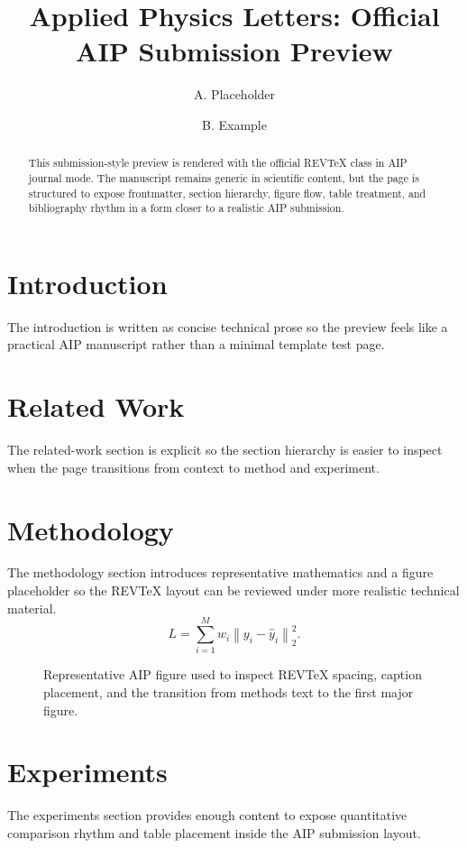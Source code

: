 \documentclass[aip,apl,reprint]{revtex4-2}
\begin{document}
\title{Applied Physics Letters: Official AIP Submission Preview}
\author{A. Placeholder}
\author{B. Example}
\begin{abstract}
This submission-style preview is rendered with the official REVTeX class in AIP journal mode. The manuscript remains generic in scientific content, but the page is structured to expose frontmatter, section hierarchy, figure flow, table treatment, and bibliography rhythm in a form closer to a realistic AIP submission.
\end{abstract}
\maketitle
\section{Introduction}
The introduction is written as concise technical prose so the preview feels like a practical AIP manuscript rather than a minimal template test page.
\section{Related Work}
The related-work section is explicit so the section hierarchy is easier to inspect when the page transitions from context to method and experiment.
\section{Methodology}
The methodology section introduces representative mathematics and a figure placeholder so the REVTeX layout can be reviewed under more realistic technical material.
\begin{equation}
L = \sum_{i=1}^{M} w_i \left\| y_i - \hat{y}_i \right\|_2^2.
\end{equation}
\begin{figure}[t]
\centering
{}
\caption{Representative AIP figure used to inspect REVTeX spacing, caption placement, and the transition from methods text to the first major figure.}
\end{figure}
\section{Experiments}
The experiments section provides enough content to expose quantitative comparison rhythm and table placement inside the AIP submission layout.
\end{document}

